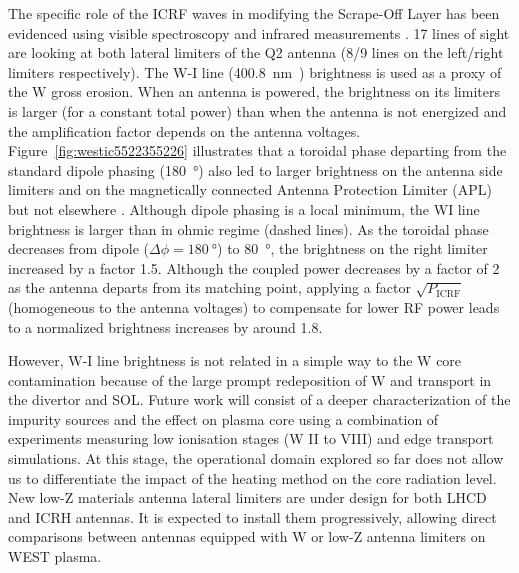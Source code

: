 \documentclass[12p]{iopart}
\begin{document}
The specific role of the ICRF waves in modifying the Scrape-Off Layer has been evidenced using visible spectroscopy and infrared measurements \cite{colas2020, urbanczyk2019, urbanczyk2021}. 17 lines of sight are looking at both lateral limiters of the Q2 antenna (8/9 lines on the left/right limiters respectively). The W-I line (\SI{400.8}{\nano\meter}~) brightness is used as a proxy of the W gross erosion. When an antenna is powered, the brightness on its limiters is larger (for a constant total power) than when the antenna is not energized and the amplification factor depends on the antenna voltages. Figure~\ref{fig:westic5522355226} illustrates that a toroidal phase departing from the standard dipole phasing (\SI{180}{\degree}) also led to larger brightness on the antenna side limiters and on the magnetically connected Antenna Protection Limiter (APL) but not elsewhere \cite{urbanczyk2019}. 
Although dipole phasing is a local minimum, the WI line brightness is larger than in ohmic regime (dashed lines). As the toroidal phase decreases from dipole ($\Delta\phi=\SI{180}{\degree}$) to \SI{80}{\degree}, the brightness on the right limiter increased by a factor 1.5. Although the coupled power decreases by a factor of 2 as the antenna departs from its matching point, applying a factor $\sqrt{P_{\mathrm{ICRF}}}$ (homogeneous to the antenna voltages) to compensate for lower RF power leads to a normalized brightness increases by around 1.8. 

However, W-I line brightness is not related in a simple way to the W core contamination because of the large prompt redeposition of W and transport in the divertor and SOL. Future work will consist of a deeper characterization of the impurity sources and the effect on plasma core using a combination of experiments measuring low ionisation stages (W II to VIII) and edge transport simulations. At this stage, the operational domain explored so far does not allow us to differentiate the impact of the heating method on the core radiation level. New low-Z materials antenna lateral limiters are under design for both LHCD and ICRH antennas. It is expected to install them progressively, allowing direct comparisons between antennas equipped with W or low-Z antenna limiters on WEST plasma.
\end{document}
